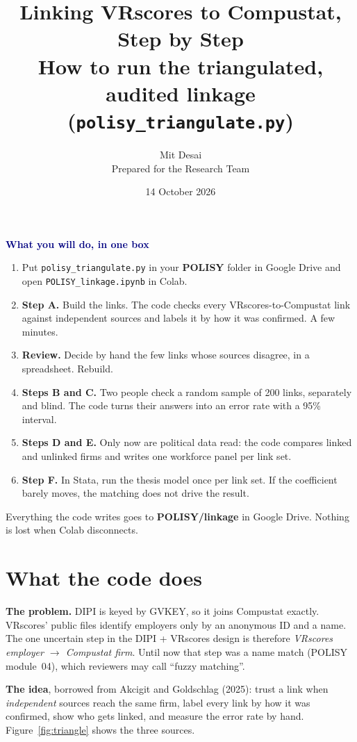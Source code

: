 \documentclass[11pt,a4paper]{article}
\title{\vspace{-0.8cm}\textbf{Linking VRscores to Compustat, Step by Step}\\[6pt]
\large How to run the triangulated, audited linkage (\texttt{polisy\_triangulate.py})}
\author{Mit Desai\\[2pt]\small Prepared for the Research Team}
\date{14 October 2026}
\newcommand{\file}[1]{\texttt{#1}}
\newenvironment{keybox}[1]{\par\smallskip\noindent\begingroup\setlength{\fboxsep}{8pt}\setlength{\fboxrule}{0.6pt}%
  \begin{lrbox}{\keyboxsave}\begin{minipage}{\dimexpr\linewidth-2\fboxsep-2\fboxrule\relax}\setlength{\parskip}{5pt}%
  \textbf{\large\textcolor{navy}{#1}}\par}
  {\end{minipage}\end{lrbox}\fcolorbox{navy!60}{navy!4}{\usebox{\keyboxsave}}\endgroup\par\smallskip}
\begin{document}
\maketitle
\thispagestyle{plain}

\begin{keybox}{What you will do, in one box}
\begin{enumerate}\setlength{\itemsep}{2pt}
\item Put \file{polisy\_triangulate.py} in your \textbf{POLISY} folder in Google Drive and open \file{POLISY\_linkage.ipynb} in Colab.
\item \textbf{Step A.} Build the links. The code checks every VRscores-to-Compustat link against independent sources and labels it by how it was confirmed. A few minutes.
\item \textbf{Review.} Decide by hand the few links whose sources disagree, in a spreadsheet. Rebuild.
\item \textbf{Steps B and C.} Two people check a random sample of 200 links, separately and blind. The code turns their answers into an error rate with a 95\% interval.
\item \textbf{Steps D and E.} Only now are political data read: the code compares linked and unlinked firms and writes one workforce panel per link set.
\item \textbf{Step F.} In Stata, run the thesis model once per link set. If the coefficient barely moves, the matching does not drive the result.
\end{enumerate}
Everything the code writes goes to \textbf{POLISY/linkage} in Google Drive. Nothing is lost when Colab disconnects.
\end{keybox}

\tableofcontents

\section{What the code does}\label{sec:what}

\textbf{The problem.} DIPI is keyed by GVKEY, so it joins Compustat exactly. VRscores' public files identify employers only by an anonymous ID and a name. The one uncertain step in the DIPI + VRscores design is therefore \emph{VRscores employer $\to$ Compustat firm}. Until now that step was a name match (POLISY module~04), which reviewers may call ``fuzzy matching''.

\textbf{The idea}, borrowed from Akcigit and Goldschlag (2025): trust a link when \emph{independent} sources reach the same firm, label every link by how it was confirmed, show who gets linked, and measure the error rate by hand. Figure~\ref{fig:triangle} shows the three sources.
\end{document}
